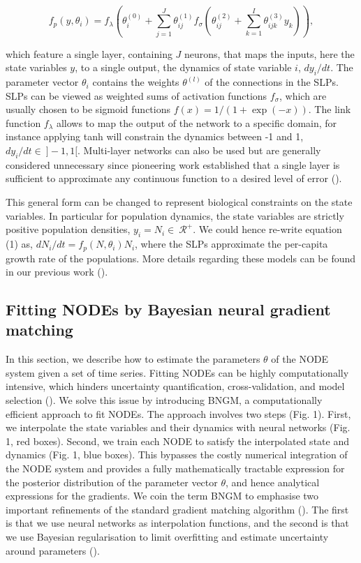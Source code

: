 \documentclass[11pt, oneside]{article}
\begin{document}
\vspace{-0.5cm}
\begin{equation}
    f_p \left(y, \theta_i \right) = f_\lambda \left( \theta_i^{(0)} + \sum_{j=1}^{J} \theta^{(1)}_{ij} f_\sigma \left( \theta^{(2)}_{ij} + \sum_{k=1}^{I} \theta^{(3)}_{ijk} y_k \right) \right),
\end{equation}

which feature a single layer, containing $J$ neurons, that maps the inputs, here the state variables $y$, to a single output, the dynamics of state variable $i$, $dy_i/dt$.
The parameter vector $\theta_i$ contains the weights $\theta^{(l)}$ of the connections in the SLPs.
SLPs can be viewed as weighted sums of activation functions $f_\sigma$, which are usually chosen to be sigmoid functions $f(x) = 1/(1+\exp(-x))$.
The link function $f_\lambda$ allows to map the output of the network to a specific domain, for instance applying tanh will constrain the dynamics between -1 and 1, $dy_i/dt \in~]-1,1[$. 
Multi-layer networks can also be used but are generally considered unnecessary since pioneering work established that a single layer is sufficient to approximate any continuous function to a desired level of error (\cite{Funahashi1993}).

This general form can be changed to represent biological constraints on the state variables.
In particular for population dynamics, the state variables are strictly positive population densities, $y_i = N_i \in~\mathcal{R^+}$.
We could hence re-write equation (1) as, $dN_i/dt = f_p(N,\theta_i)N_i$, where the SLPs approximate the per-capita growth rate of the populations.
More details regarding these models can be found in our previous work (\cite{Bonnaffe2021a}).

\subsection{Fitting NODEs by Bayesian neural gradient matching}

In this section, we describe how to estimate the parameters $\theta$ of the NODE system given a set of time series. 
Fitting NODEs can be highly computationally intensive, which hinders uncertainty quantification, cross-validation, and model selection (\cite{Bonnaffe2021a}).
We solve this issue by introducing BNGM, a computationally efficient approach to fit NODEs.
The approach involves two steps (Fig. 1).
First, we interpolate the state variables and their dynamics with neural networks (Fig. 1, red boxes).
Second, we train each NODE to satisfy the interpolated state and dynamics (Fig. 1, blue boxes).
This bypasses the costly numerical integration of the NODE system and provides a fully mathematically tractable expression for the posterior distribution of the parameter vector $\theta$, and hence analytical expressions for the gradients. 
We coin the term BNGM to emphasise two important refinements of the standard gradient matching algorithm (\cite{Ellner2002}). 
The first is that we use neural networks as interpolation functions, and the second is that we use Bayesian regularisation to limit overfitting and estimate uncertainty around parameters (\cite{Cawley2007}).
\end{document}
